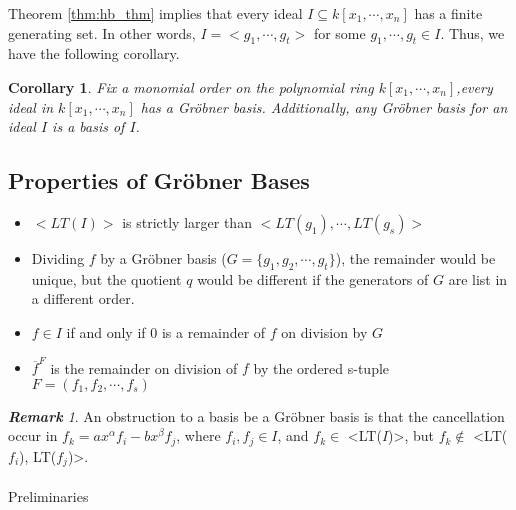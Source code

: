 \documentclass{article}
\newtheorem{corollary}{Corollary}[theorem]
\theoremstyle{definition}
\theoremstyle{remark}
\newtheorem*{remark}{\textbf{Remark}}
\theoremstyle{example}
\begin{document}
Theorem \ref{thm:hb_thm} implies that every ideal $I \subseteq k[x_1, \cdots, x_n]$ has a finite generating set. In other words, $I = <g_1, \cdots, g_t>$ for some $g_1, \cdots, g_t \in I$. Thus, we have the following corollary.

\begin{corollary}\cite{cox_grobner_2015}\label{cor:gbI}
    Fix a monomial order on the polynomial ring $k[x_1,\cdots,x_n]$,every ideal in $k[x_1, \cdots, x_n]$ has a Gröbner basis. Additionally, any Gröbner basis for an ideal $I$ is a basis of $I$.
\end{corollary}

\subsection{Properties of Gröbner Bases}
\begin{itemize}
    \item $<LT(I)>$ is strictly larger than $<LT(g_1), \cdots, LT(g_s)>$
    \item Dividing $f$ by a Gröbner basis ($G = \{g_1, g_2, \cdots, g_t\}$), the remainder would be unique, but the quotient $q$ would be different if the generators of $G$ are list in a different order.
    \item $f \in I$ if and only if $0$ is a remainder of $f$ on division by $G$
    \item $\overline{f}^{F}$ is the remainder on division of $f$ by the ordered s-tuple $F = (f_1, f_2, \cdots, f_s)$
\end{itemize}

\begin{remark}
    An obstruction to a basis be a Gröbner basis is that the cancellation occur in $f_k = ax^{\alpha}f_i - bx^{\beta}f_{j}$, where $f_i,f_j \in I$, and $f_k \in$ <LT($I$)>, but $f_k \notin$ <LT($f_i$), LT($f_j$)>.
\end{remark}


\paragraph{  }
Preliminaries
\end{document}
